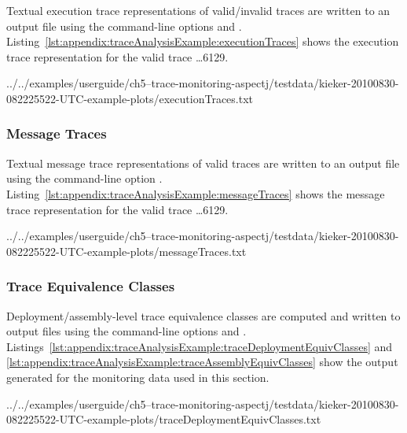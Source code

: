 Textual execution trace representations of valid/invalid traces are written to %
an output file using the command-line options \OPT{\OPTprintValidExecutionTraces} and %
\OPT{\OPTprintInvalidExecutionTraces}. %
Listing~\ref{lst:appendix:traceAnalysisExample:executionTraces} %
shows the execution trace representation for the valid trace \ldots6129.

\setTextListing
%
{../../examples/userguide/ch5--trace-monitoring-aspectj/testdata/kieker-20100830-082225522-UTC-example-plots/executionTraces.txt} %

\subsubsection{Message Traces}\label{sec:example:messageTraces}%

Textual message trace representations of valid traces are written to an output %
file using the command-line option \OPT{\OPTprintMessageTraces}. %
Listing~\ref{lst:appendix:traceAnalysisExample:messageTraces} %
shows the message trace representation for the valid trace \ldots6129.

\setTextListing
%
{../../examples/userguide/ch5--trace-monitoring-aspectj/testdata/kieker-20100830-082225522-UTC-example-plots/messageTraces.txt}

\subsubsection{Trace Equivalence Classes}\label{sec:example:traceEquivClasses}%

Deployment/assembly-level trace equivalence classes are computed and written %
to output files using the command-line options \OPT{\OPTprintDeploymentEquivalenceClasses} %
and \OPT{\OPTprintAssemblyEquivalenceClasses}. %
Listings~\ref{lst:appendix:traceAnalysisExample:traceDeploymentEquivClasses} and %
\ref{lst:appendix:traceAnalysisExample:traceAssemblyEquivClasses} show the %
output generated for the monitoring data used in this section. %

\setTextListing

{../../examples/userguide/ch5--trace-monitoring-aspectj/testdata/kieker-20100830-082225522-UTC-example-plots/traceDeploymentEquivClasses.txt}

